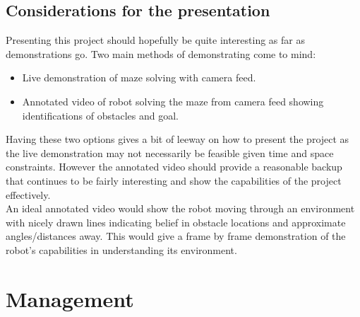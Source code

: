 \documentclass[10pt,a4paper]{report}
\begin{document}
	\subsection*{Considerations for the presentation}
		Presenting this project should hopefully be quite interesting as far as demonstrations go. Two main methods of demonstrating come to mind: \\
		\begin{itemize}
			\item Live demonstration of maze solving with camera feed.
			\item Annotated video of robot solving the maze from camera feed showing identifications of obstacles and goal.
		\end{itemize}
		Having these two options gives a bit of leeway on how to present the project as the live demonstration may not necessarily be feasible given time and space constraints. However the annotated video should provide a reasonable backup that continues to be fairly interesting and show the capabilities of the project effectively. \\
		An ideal annotated video would show the robot moving through an environment with nicely drawn lines indicating belief in obstacle locations and approximate angles/distances away. This would give a frame by frame demonstration of the robot's capabilities in understanding its environment.
	

\section*{Management}



\end{document}
